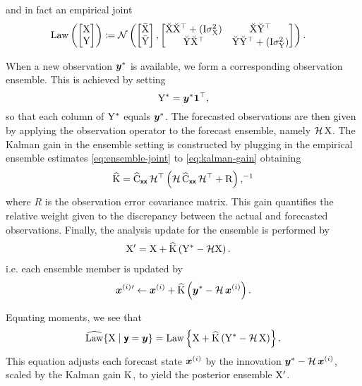 \documentclass{article}
\begin{document}
and in fact an empirical joint
\begin{align}
    \operatorname{Law}\left(\begin{bmatrix}
        \mathrm{X}\\
        \mathrm{Y}
    \end{bmatrix}\right) &\coloneq \mathcal{N}\left(\begin{bmatrix}
        \bar{\mathrm{X}}\\
        \bar{\mathrm{Y}}
    \end{bmatrix},
    \begin{bmatrix}
        \breve{\mathrm{X}} \breve{\mathrm{X}}^\top + (\mathrm{I}\sigma^2_{\mathrm{X}}) & \breve{\mathrm{X}} \breve{\mathrm{Y}}^\top \\
        \breve{\mathrm{Y}} \breve{\mathrm{X}}^\top  & \breve{\mathrm{Y}} \breve{\mathrm{Y}}^\top + (\mathrm{I}\sigma^2_{\mathrm{Y}})
    \end{bmatrix}
    \right).\label{eq:ensemble-joint}
\end{align}

When a new observation \(\boldsymbol{y}^*\) is available, we form a corresponding observation ensemble.
This is achieved by setting
\[
\mathrm{Y}^* = \boldsymbol{y}^* \mathbf{1}^\top,
\]
so that each column of \(\mathrm{Y}^*\) equals \(\boldsymbol{y}^*\). The forecasted observations are then given by applying the observation operator to the forecast ensemble, namely \(\mathcal{H}\,\mathrm{X}\).
The Kalman gain in the ensemble setting is constructed by plugging in the empirical ensemble estimates \eqref{eq:ensemble-joint} to \eqref{eq:kalman-gain} obtaining
\begin{align}
\widehat{\mathrm{K}}= \widehat{\mathrm{C}}_{\boldsymbol{\mathsf{xx}}}\, \mathcal{H}^\top \left(\mathcal{H}\,\widehat{\mathrm{C}}_{\boldsymbol{\mathsf{xx}}}\, \mathcal{H}^\top + \mathrm{R}\right),^{-1}\label{eq:ensemble-kalman-gain}
\end{align}
where \(R\) is the observation error covariance matrix. This gain quantifies the relative weight given to the discrepancy between the actual and forecasted observations.
Finally, the analysis update for the ensemble is performed by
\begin{align}
    \mathrm{X}' &= \mathrm{X} + \widehat{\mathrm{K}} \left(\mathrm{Y}^* - \mathcal{H}\mathrm{X}\right).
\end{align}
i.e. each ensemble member is updated by
\begin{align}
\boldsymbol{x}^{(i)}{}' \gets \boldsymbol{x}^{(i)} + \widehat{\mathrm{K}} \left(\boldsymbol{y}^* - \mathcal{H}\,\boldsymbol{x}^{(i)}\right).
\end{align}

Equating moments, we see that
\begin{align}
\widehat{\operatorname{Law}}\{\mathrm{X}\mid \boldsymbol{\mathsf{y}}=\boldsymbol{y}\}= \operatorname{Law}\left\{\mathrm{X} + \widehat{\mathrm{K}} \left(\mathrm{Y}^* - \mathcal{H}\,\mathrm{X}\right)\right\}.
\end{align}
This equation adjusts each forecast state \(\boldsymbol{x}^{(i)}\) by the innovation \(\boldsymbol{y}^* - \mathcal{H}\,\boldsymbol{x}^{(i)}\), scaled by the Kalman gain \(\mathrm{K}\), to yield the posterior ensemble \(\mathrm{X}'\).
\end{document}
